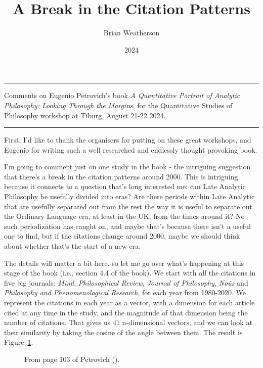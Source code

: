 \documentclass[
  10pt,
  letterpaper,
  DIV=11,
  numbers=noendperiod,
  twoside]{scrartcl}
\title{A Break in the Citation Patterns}
\author{Brian Weatherson}
\date{2024}
\renewenvironment{abstract}
 {\vspace{-1.25cm}
 \quotation\small\noindent\rule{\linewidth}{.5pt}\par\smallskip
 \noindent }
 {\par\noindent\rule{\linewidth}{.5pt}\endquotation}
\begin{document}
\maketitle
\begin{abstract}
Comments on Eugenio Petrovich's book \emph{A Quantitative Portrait of
Analytic Philosophy: Looking Through the Margins}, for the Quantitative
Studies of Philosophy workshop at Tiburg, August 21-22 2024.
\end{abstract}

First, I'd like to thank the organisers for putting on these great
workshops, and Eugenio for writing such a well researched and endlessly
thought provoking book.

I'm going to comment just on one study in the book - the intriguing
suggestion that there's a break in the citation patterns around 2000.
This is intriguing because it connects to a question that's long
interested me: can Late Analytic Philosophy be usefully divided into
eras? Are there periods within Late Analytic that are usefully separated
out from the rest the way it is useful to separate out the Ordinary
Language era, at least in the UK, from the times around it? No such
periodization has caught on, and maybe that's because there isn't a
useful one to find, but if the citations change around 2000, maybe we
should think about whether that's the start of a new era.

The details will matter a bit here, so let me go over what's happening
at this stage of the book (i.e., section 4.4 of the book). We start with
all the citations in five big journals: \emph{Mind}, \emph{Philosophical
Review}, \emph{Journal of Philosophy}, \emph{Noûs} and \emph{Philosophy
and Phenomenological Research}, for each year from 1980-2020. We
represent the citations in each year as a vector, with a dimension for
each article cited at any time in the study, and the magnitude of that
dimension being the number of citations. That gives us 41 n-dimensional
vectors, and we can look at their similarity by taking the cosine of the
angle between them. The result is Figure~\ref{fig-eugenio-matrix}.

\begin{figure}


\caption{\label{fig-eugenio-matrix}From page 103 of Petrovich
().}

\end{figure}%
\end{document}
